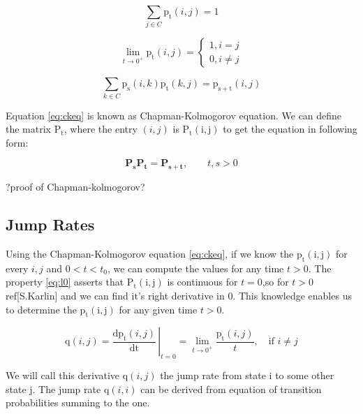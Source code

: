 \documentclass[thesis=M,english]{FITthesis}[2012/10/20]
\newcommand{\matr}[1]{\mathbf{#1}}
\begin{document}
\begin{equation}
\sum_{j \in C} \mathrm{p_t}(i,j) = 1
\end{equation}

\begin{equation}\label{eq:l0}  
\lim_{t \to 0^+} \mathrm{p_t}(i,j)= 
\begin{cases}
1, i = j\\
0, i \neq j
\end{cases}
\end{equation}

\begin{equation}\label{eq:ckeq}
\sum_{k \in C}\mathrm{p_s}(i,k)\mathrm{p_t}(k,j) = \mathrm{p_{s+t}}(i,j)     
\end{equation}

Equation \eqref{eq:ckeq} is known as Chapman-Kolmogorov equation. 
We can define the matrix $\mathrm{P_t}$, where the entry $(i,j)$ is $\mathrm{P_t(i,j)}$ to get the equation in following form:

\begin{equation}
\matr{P_s} \matr{P_t} = \matr{P_{s+t}},   \qquad t,s > 0  
\end{equation}

?proof of Chapman-kolmogorov?


\subsection{ Jump Rates }

Using the Chapman-Kolmogorov equation \eqref{eq:ckeq}, if we know the $\mathrm{p_t(i,j)}$ for every $i,j$ and $0 < t < t_0$, we can compute the values for any time $t > 0$. The property \eqref{eq:l0} asserts that $\mathrm{P_t(i,j)}$ is continuous for $t=0$,so for $t>0$ ref[S.Karlin] and we can find it's right derivative in 0. This knowledge enables us to determine the $\mathrm{p_t(i,j)}$ for any given time $t>0$.   

\begin{equation}
\mathrm{q}(i,j) =  \left.\frac{\mathrm{d}\mathrm{p_t}(i,j)}{\mathrm{dt}} \,\right|_{t=0} = \lim_{t \to 0^+} \frac{\mathrm{p_t}(i,j)}{t}, \quad \text{if } i\neq j     
\end{equation}

We will call this derivative $\mathrm{q}(i,j)$ the jump rate from state i to some other state j. The jump rate $\mathrm{q}(i,i)$ can be derived from equation of transition probabilities summing to the one.
\end{document}
